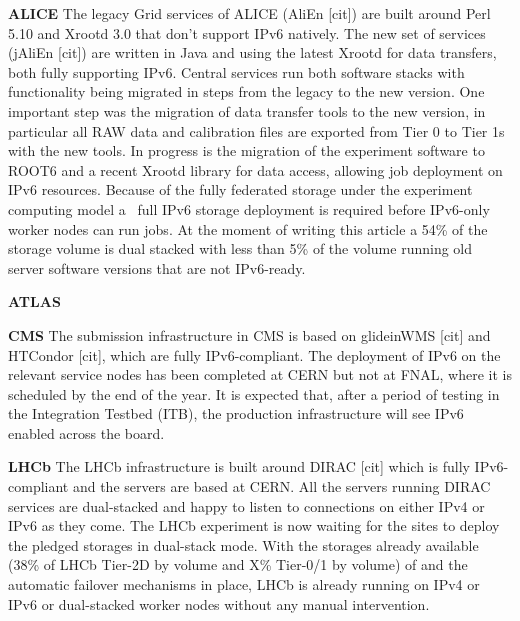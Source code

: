 \textbf{ALICE}
The legacy Grid services of ALICE (AliEn [cit]) are built around Perl 5.10 and Xrootd 3.0 that don’t support IPv6 natively. The new set of services (jAliEn [cit]) are written in Java and using the latest Xrootd for data transfers, both fully supporting IPv6. Central services run both software stacks with functionality being migrated in steps from the legacy to the new version. One important step was the migration of data transfer tools to the new version, in particular all RAW data and calibration files are exported from Tier 0 to Tier 1s with the new tools. In progress is the migration of the experiment software to ROOT6 and a recent Xrootd library for data access, allowing job deployment on IPv6 resources.
Because of the fully federated storage under the experiment computing model a ~full IPv6 storage deployment is required before IPv6-only worker nodes can run jobs. At the moment of writing this article a 54\% of the storage volume is dual stacked with less than 5\% of the volume running old server software versions that are not IPv6-ready.

\textbf{ATLAS}


\textbf{CMS}
The submission infrastructure in CMS is based on glideinWMS [cit] and HTCondor [cit], which are fully IPv6-compliant. The deployment of IPv6 on the relevant service nodes has been completed at CERN but not at FNAL, where it is scheduled by the end of the year. It is expected that, after a period of testing in the Integration Testbed (ITB), the production infrastructure will see IPv6 enabled across the board.

\textbf{LHCb}
The LHCb infrastructure is built around DIRAC [cit] which is fully IPv6-compliant and the servers are based at CERN. All the servers running DIRAC services are dual-stacked and happy to listen to connections on either IPv4 or IPv6 as they come. The LHCb experiment is now waiting for the sites to deploy the pledged storages in dual-stack mode. With the storages already available (38\% of LHCb Tier-2D by volume and X\% Tier-0/1 by volume) of  and the automatic failover mechanisms in place, LHCb is already running on IPv4 or IPv6 or dual-stacked worker nodes without any manual intervention.
